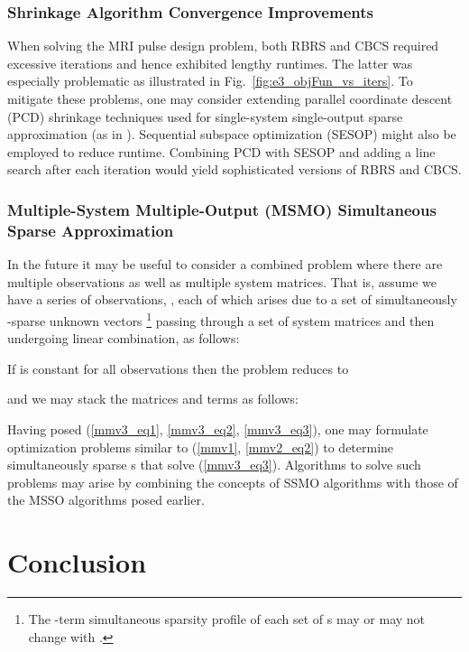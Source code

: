 \documentclass[final]{siamltex}
\begin{document}
   \subsubsection{Shrinkage Algorithm Convergence Improvements} When
   solving the MRI pulse design problem, both RBRS and CBCS required
   excessive iterations and hence exhibited lengthy runtimes.  The
   latter was especially problematic as illustrated in
   Fig.~\ref{fig:e3_objFun_vs_iters}.  To mitigate these problems, one
   may consider extending parallel coordinate descent (PCD) shrinkage
   techniques used for single-system single-output sparse
   approximation (as in \cite{Ela2006_TransIT, Ela2006}).  Sequential
   subspace optimization (SESOP) \cite{Ela2007} might also be employed
   to reduce runtime.  Combining PCD with SESOP and adding a line
   search after each iteration would yield sophisticated versions of
   RBRS and CBCS\@.

   \subsubsection{Multiple-System Multiple-Output (MSMO) Simultaneous
   Sparse Approximation} In the future it may be useful to consider a
   combined problem where there are multiple observations as well as
   multiple system matrices.  That is, assume we have a series of 
   observations, , each of which arises
   due to a set of  simultaneously -sparse unknown vectors
   \footnote{The -term
   simultaneous sparsity profile of each set of s may or
   may not change with .}  passing through a set of  system
   matrices  and then undergoing
   linear combination, as follows:
   
   If  is constant for all  observations then the
   problem reduces to
   
   and we may stack the matrices and terms as follows:
   
   Having posed (\ref{mmv3_eq1}, \ref{mmv3_eq2}, \ref{mmv3_eq3}), one
   may formulate optimization problems similar to (\ref{mmv1},
   \ref{mmv2_eq2}) to determine simultaneously sparse s
   that solve (\ref{mmv3_eq3}).  Algorithms to solve such problems may
   arise by combining the concepts of SSMO algorithms
   \cite{Cot2005,Mal2005,Tro2006_I,Tro2006_II} with those of the MSSO
   algorithms posed earlier.

\section{Conclusion}
\label{sec:conclusion}
\end{document}
